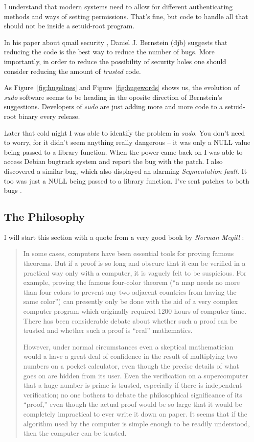 \documentclass{article}
\begin{document}
I understand that modern systems need to allow for different authenticating
methods and ways of setting permissions. That's fine, but code to handle all
that should not be inside a setuid-root program.

In his paper about qmail security \cite{djb}, Daniel J. Bernstein (djb) suggests
that reducing the code is the best way to reduce the number of bugs. More
importantly, in order to reduce the possibility of security holes one should
consider reducing the amount of \emph{trusted} code.

As Figure~\ref{fig:hugelines} and Figure~\ref{fig:hugewords} shows us, the
evolution of \emph{sudo} software seems to be heading in the oposite direction
of Bernstein's suggestions.  Developers of \emph{sudo} are just adding more and
more code to a setuid-root binary every release.

Later that cold night I was able to identify the problem in \emph{sudo}. You
don't need to worry, for it didn't seem anything really dangerous -- it was only
a NULL value being passed to a library function. When the power came back on I
was able to access Debian bugtrack system and report the bug with the patch. I
also discovered a similar bug, which also displayed an alarming
\emph{Segmentation fault}. It too was just a NULL being passed to a library
function. I've sent patches to both bugs \cite{bug1} \cite{bug2}.

\subsection{The Philosophy}
I will start this section with a quote from a very good book by \emph{Norman
Megill} \cite{metamath}:
\begin{quote}
In some cases, computers have been essential tools for proving famous theorems.
But if a proof is so long and obscure that it can be verified in a practical way
only with a computer, it is vaguely felt to be suspicious.  For example, proving
the famous four-color theorem (``a map needs no more than four colors to prevent
any two adjacent countries from having the same color'') can presently only be
done with the aid of a very complex computer program which originally required
1200 hours of computer time. There has been considerable debate about whether
such a proof can be trusted and whether such a proof is ``real'' mathematics.

However, under normal circumstances even a skeptical mathematician would a have
a great deal of confidence in the result of multiplying two numbers on a pocket
calculator, even though the precise details of what goes on are hidden from its
user. Even the verification on a supercomputer that a huge number is prime is
trusted, especially if there is independent verification; no one bothers to
debate the philosophical significance of its ``proof,'' even though the actual
proof would be so large that it would be completely impractical to ever write it
down on paper. It seems that if the algorithm used by the computer is simple
enough to be readily understood, then the computer can be trusted.
\end{quote}
\end{document}
